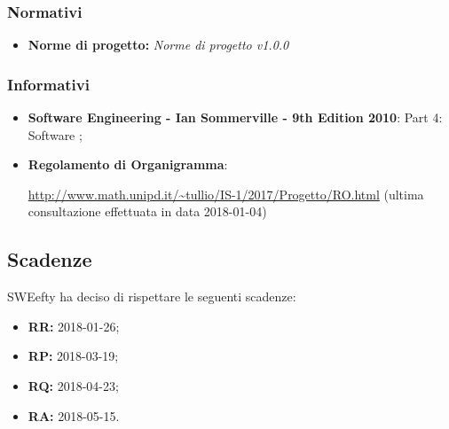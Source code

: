 			\subsubsection{Normativi}
			\begin{itemize}
				\item \textbf{Norme di progetto:} \emph{Norme di progetto v1.0.0}
			\end{itemize}
			\subsubsection{Informativi}
			\begin{itemize}
				\item \textbf{Software Engineering - Ian Sommerville - 9th Edition 2010}:  Part 4: Software ;
				\item \textbf{Regolamento di Organigramma}: \par
				\url{http://www.math.unipd.it/~tullio/IS-1/2017/Progetto/RO.html} (ultima consultazione effettuata in data 2018-01-04)
			\end{itemize}
			
	\subsection{Scadenze}
	\label{scadenze}
	SWEefty ha deciso di rispettare le seguenti scadenze:
	\begin{itemize}
		\item \textbf{RR:} 2018-01-26;
		\item \textbf{RP:} 2018-03-19;
		\item \textbf{RQ:} 2018-04-23;
		\item \textbf{RA:} 2018-05-15.
	\end{itemize}

